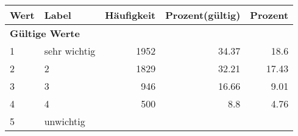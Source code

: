      \begin{longtable}{lXrrr}
     \toprule
     \textbf{Wert} & \textbf{Label} & \textbf{Häufigkeit} & \textbf{Prozent(gültig)} & \textbf{Prozent} \\
     \endhead
     \midrule
     \multicolumn{5}{l}{\textbf{Gültige Werte}}\\

     1 &
     \multicolumn{1}{X}{ sehr wichtig   } &


       \num{1952} &
       \num[round-mode=places,round-precision=2]{34.37} &
         \num[round-mode=places,round-precision=2]{18.6} \\

     2 &
     \multicolumn{1}{X}{ 2   } &


       \num{1829} &
       \num[round-mode=places,round-precision=2]{32.21} &
         \num[round-mode=places,round-precision=2]{17.43} \\

     3 &
     \multicolumn{1}{X}{ 3   } &


       \num{946} &
       \num[round-mode=places,round-precision=2]{16.66} &
         \num[round-mode=places,round-precision=2]{9.01} \\

     4 &
     \multicolumn{1}{X}{ 4   } &


       \num{500} &
       \num[round-mode=places,round-precision=2]{8.8} &
         \num[round-mode=places,round-precision=2]{4.76} \\

     5 &
     \multicolumn{1}{X}{ unwichtig   } &



\end{longtable}
